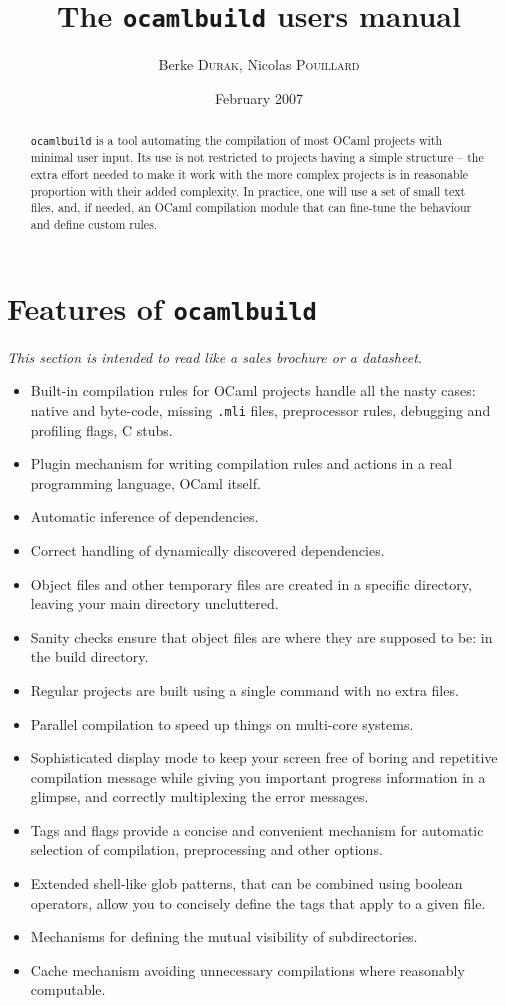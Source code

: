 \documentclass[9pt]{article}
\newcommand{\ocb}{\texttt{ocamlbuild}\xspace}
\begin{document}
\title{The \ocb users manual}
\author{Berke \textsc{Durak}, Nicolas \textsc{Pouillard}}
\date{February 2007}
\maketitle
\begin{abstract}
\ocb is a tool automating the compilation of most OCaml projects with minimal
user input.  Its use is not restricted to projects having a simple structure --
the extra effort needed to make it work with the more complex projects is in
reasonable proportion with their added complexity.  In practice, one will use a
set of small text files, and, if needed, an OCaml compilation module that can
fine-tune the behaviour and define custom rules.
\end{abstract}
\section{Features of \ocb}
{\em This section is intended to read like a sales brochure or a datasheet.}

\begin{itemize}
\item Built-in compilation rules for OCaml projects handle all the nasty cases: native and byte-code,
missing \texttt{.mli} files, preprocessor rules, debugging and profiling flags, C stubs.
\item Plugin mechanism for writing compilation rules and actions in a real programming language,
OCaml itself.
\item Automatic inference of dependencies.
\item Correct handling of dynamically discovered dependencies.
\item Object files and other temporary files are created in a specific directory, leaving your main directory uncluttered.  
\item Sanity checks ensure that object files are where they are supposed to be: in the build directory.
\item Regular projects are built using a single command with no extra files.
\item Parallel compilation to speed up things on multi-core systems.
\item Sophisticated display mode to keep your screen free of boring and repetitive compilation message
while giving you important progress information in a glimpse, and correctly multiplexing the error messages.
\item Tags and flags provide a concise and convenient mechanism for automatic selection of compilation, preprocessing and
other options.
\item Extended shell-like glob patterns, that can be combined using boolean operators,
allow you to concisely define the tags that apply to a given file.
\item Mechanisms for defining the mutual visibility of subdirectories.
\item Cache mechanism avoiding unnecessary compilations where reasonably computable.
\end{itemize}
\end{document}
